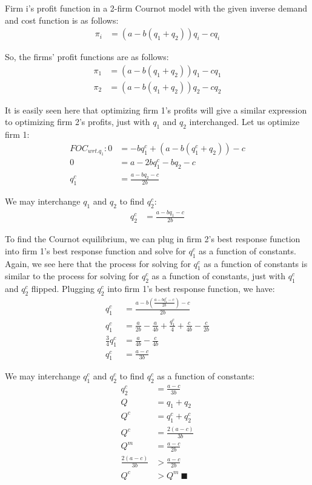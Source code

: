 \documentclass[12pt,letterpaper]{article}
\begin{document}
\begin{enumerate}
\begin{enumerate}
    Firm i's profit function in a 2-firm Cournot model with the given inverse demand and cost function is as follows:
    \begin{align*}
        \pi_i &= (a - b(q_1 + q_2))q_i - cq_i
    \end{align*}
    
    So, the firms' profit functions are as follows:
    \begin{align*}
        \pi_1 &= (a - b(q_1 + q_2))q_1 - cq_1\\
        \pi_2 &= (a - b(q_1 + q_2))q_2 - cq_2
    \end{align*}
    
    It is easily seen here that optimizing firm 1's profits will give a similar expression to optimizing firm 2's profits, just with $q_1$ and $q_2$ interchanged. Let us optimize firm 1:
    \begin{align*}
        FOC_{wrt.q_1}: 0 &= -bq_1^c + (a-b(q_1^c + q_2)) - c\\
        0 &= a - 2bq_1^c - bq_2 - c\\
        q_1^c &= \frac{a - bq_2 - c}{2b}
    \end{align*}
    
    We may interchange $q_1$ and $q_2$ to find $q_2^c$:
    \begin{align*}
        q_2^c &= \frac{a - bq_1 - c}{2b}
    \end{align*}
    
    To find the Cournot equilibrium, we can plug in firm 2's best response  function into firm 1's best response function and solve for $q_1^c$ as a function of constants. Again, we see here that the process for solving for $q_1^c$ as a function of constants is similar to the process for solving for $q_2^c$ as a function of constants, just with $q_1^c$ and $q_2^c$ flipped. Plugging $q_2^c$ into firm 1's best response function, we have:
    \begin{align*}
        q_1^c &= \frac{a - b(\frac{a - bq_1^c - c}{2b}) - c}{2b}\\
        q_1^c &= \frac{a}{2b} - \frac{a}{4b} + \frac{q_1^c}{4} + \frac{c}{4b} - \frac{c}{2b}\\
        \frac{3}{4}q_1^c &= \frac{a}{4b} - \frac{c}{4b}\\
        q_1^c &= \frac{a-c}{3b}
    \end{align*}
    
    We may interchange $q_1^c$ and $q_2^c$ to find $q_2^c$ as a function of constants:
    \begin{align*}
        q_2^c &= \frac{a-c}{3b}\\
        Q &= q_1 + q_2\\
        Q^c &= q_1^c + q_2^c\\
        Q^c &= \frac{2(a-c)}{3b}\\
        Q^m &= \frac{a-c}{2b}\\
        \frac{2(a-c)}{3b} &> \frac{a-c}{2b}\\
        Q^c &> Q^m \ \blacksquare
    \end{align*}
    

\end{enumerate}
\end{enumerate}
\end{document}
